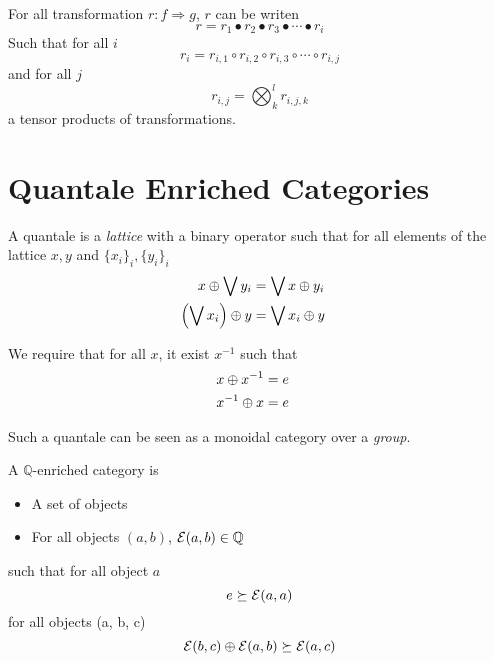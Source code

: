 \documentclass[a4paper]{article}
\begin{document}
\begin{corollary}
For all transformation $r: f \Rightarrow g$, $r$ can be writen
\[
r = r_1 \bullet r_2 \bullet r_3 \bullet \cdots \bullet r_i
\]
Such that for all $i$
\[
r_i = r_{i, 1} \circ r_{i, 2} \circ r_{i, 3} \circ \cdots \circ r_{i, j}
\]
and for all $j$
\[
r_{i, j} = \bigotimes_k^l r_{i, j, k}
\]
a tensor products of transformations.
\end{corollary}

\section{Quantale Enriched Categories}
\label{sec:quant-enrich-categ}


\begin{definition}
A quantale is a \emph{lattice} with a binary operator such that for all elements of the lattice $x, y$ and $\{x_i\}_i, \{y_i\}_i$
\begin{align}
x \oplus \bigvee y_i &= \bigvee x \oplus y_i \cr
\left(\bigvee x_i\right) \oplus y &= \bigvee x_i \oplus y
\end{align}

We require that for all $x$, it exist $x^{-1}$ such that
\begin{align}
x \oplus x^{-1} &= e \cr
x^{-1} \oplus x &= e
\end{align}

Such a quantale can be seen as a monoidal category over a \emph{group}.
\end{definition}

\begin{definition}
A $\mathbb{Q}$-enriched category \catE is

\begin{itemize}
\item A set of objects
\item For all objects $(a, b)$, ${\cal E}(a, b) \in \mathbb{Q}$
\end{itemize}

such that for all object $a$
\[
e \succeq {\cal E}(a, a)
\]
for all objects (a, b, c)
\[
{\cal E}(b, c) \oplus {\cal E}(a, b) \succeq {\cal E}(a, c)
\]
\end{definition}
\end{document}
